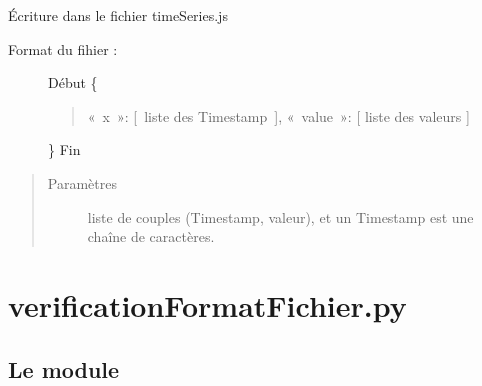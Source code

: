 \documentclass[letterpaper,10pt,french]{sphinxmanual}
\begin{document}
\begin{fulllineitems}
\label{\detokenize{addQuantitativesDiscretes:add.addQuantitativesDiscretes.infoSerieTemporelle}}
Écriture dans le fichier timeSeries.js
\begin{description}
\item[{Format du fihier :}] \leavevmode
Début
\{
\begin{quote}

« x »: {[} liste des Timestamp {]},
« value »: {[} liste des valeurs {]}
\end{quote}

\}
Fin

\end{description}
\begin{quote}\begin{description}
\item[{Paramètres}] \leavevmode
{} \textendash{} liste de couples (Timestamp, valeur), et un Timestamp est une chaîne de caractères.

\end{description}\end{quote}

\end{fulllineitems}



\chapter{verificationFormatFichier.py}
\label{\detokenize{verificationFormatFichier:verificationformatfichier-py}}\label{\detokenize{verificationFormatFichier::doc}}\label{\detokenize{verificationFormatFichier:module-chargement_des_donnees.verificationFormatFichier}}

\section{Le module }
\label{\detokenize{verificationFormatFichier:le-module-verification-format-fichier}}
\end{document}
